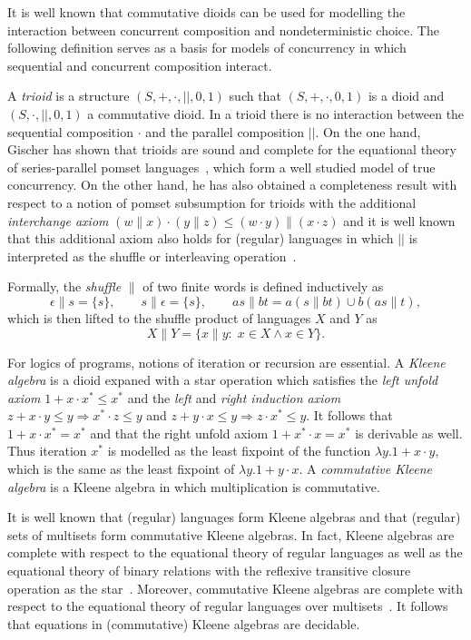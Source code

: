 \documentclass{llncs}
\begin{document}
It is well known that commutative dioids can be used for modelling the
interaction between concurrent composition and nondeterministic
choice. The following definition serves as a basis for models of
concurrency in which sequential and concurrent composition
interact.

A \emph{trioid} is a structure $(S,+,\cdot,||,0,1)$ such that
$(S,+,\cdot,0,1)$ is a dioid and $(S,\cdot,||,0,1)$ a commutative
dioid. In a trioid there is no interaction between the sequential
composition $\cdot$ and the parallel composition $||$. On the one
hand, Gischer has shown that trioids are sound and complete for the
equational theory of series-parallel pomset languages~\cite{gischer_equational_1988},
which form a well studied model of true concurrency. On the other
hand, he has also obtained a completeness result with respect to a
notion of pomset subsumption for trioids with the additional
\emph{interchange axiom} $(w \| x) \cdot (y \| z) \le (w \cdot y) \|
(x \cdot z)$ and it is well known that this additional axiom also
holds for (regular) languages in which $||$ is interpreted as the
shuffle or interleaving operation~\cite{gischer_shuffle_1981}.

Formally, the \emph{shuffle} $\|$ of two finite words is defined
inductively as
\begin{equation*}
\epsilon \| s = \{s\}, \qquad s \| \epsilon = \{s\},\qquad
as \| bt = a(s \| bt) \cup b(as \| t),
\end{equation*}
which is then lifted to the shuffle product of languages $X$ and $Y$
as
\begin{equation*}
X \| Y = \{x \| y:\; x \in X \land x \in Y\}.
\end{equation*}

For logics of programs, notions of iteration or recursion are
essential. A \emph{Kleene algebra} is a dioid expaned with a star
operation which satisfies the \emph{left unfold axiom} $1 + x\cdot
x^*\le x^*$ and the \emph{left} and \emph{right induction axiom} $z+x
\cdot y \le y\Rightarrow x^*\cdot z \le y$ and $z + y\cdot x \le y
\Rightarrow z\cdot x^* \le y$. It follows that $1+x\cdot x^* = x^*$
and that the right unfold axiom $1+x^*\cdot x=x^*$ is derivable as
well. Thus iteration $x^\ast$ is modelled as the least fixpoint of the
function $\lambda y. 1+x\cdot y$, which is the same as the least
fixpoint of $\lambda y.1+ y\cdot x$. A \emph{commutative Kleene
  algebra} is a Kleene algebra in which multiplication is commutative.

It is well known that (regular) languages form Kleene algebras and
that (regular) sets of multisets form commutative Kleene algebras. In
fact, Kleene algebras are complete with respect to the equational
theory of regular languages as well as the equational theory of binary
relations with the reflexive transitive closure operation as the
star~\cite{kozen_completeness_1994}. Moreover, commutative Kleene
algebras are complete with respect to the equational theory of regular
languages over multisets~\cite{conway_regular_1971}. It follows that
equations in (commutative) Kleene algebras are decidable.
\end{document}
